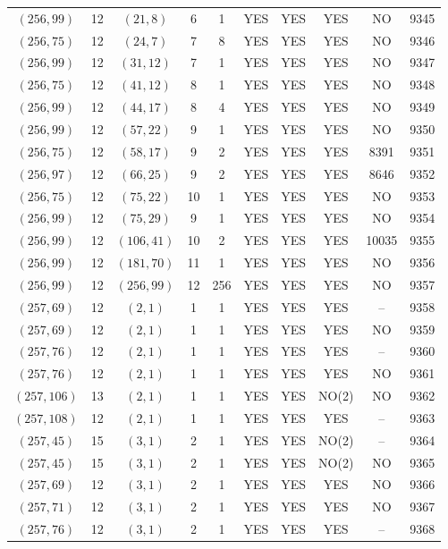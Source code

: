 \begin{longtable}{|c|c|c|c|c|c|c|c|c|c|}
$(256, 99)$ & 12 & $(21, 8)$ & 6 & 1 & YES & YES & YES & NO & 9345\\
$(256, 75)$ & 12 & $(24, 7)$ & 7 & 8 & YES & YES & YES & NO & 9346\\
$(256, 99)$ & 12 & $(31, 12)$ & 7 & 1 & YES & YES & YES & NO & 9347\\
$(256, 75)$ & 12 & $(41, 12)$ & 8 & 1 & YES & YES & YES & NO & 9348\\
$(256, 99)$ & 12 & $(44, 17)$ & 8 & 4 & YES & YES & YES & NO & 9349\\
$(256, 99)$ & 12 & $(57, 22)$ & 9 & 1 & YES & YES & YES & NO & 9350\\
$(256, 75)$ & 12 & $(58, 17)$ & 9 & 2 & YES & YES & YES & 8391 & 9351\\
$(256, 97)$ & 12 & $(66, 25)$ & 9 & 2 & YES & YES & YES & 8646 & 9352\\
$(256, 75)$ & 12 & $(75, 22)$ & 10 & 1 & YES & YES & YES & NO & 9353\\
$(256, 99)$ & 12 & $(75, 29)$ & 9 & 1 & YES & YES & YES & NO & 9354\\
$(256, 99)$ & 12 & $(106, 41)$ & 10 & 2 & YES & YES & YES & 10035 & 9355\\
$(256, 99)$ & 12 & $(181, 70)$ & 11 & 1 & YES & YES & YES & NO & 9356\\
$(256, 99)$ & 12 & $(256, 99)$ & 12 & 256 & YES & YES & YES & NO & 9357\\
$(257, 69)$ & 12 & $(2, 1)$ & 1 & 1 & YES & YES & YES & -- & 9358\\
$(257, 69)$ & 12 & $(2, 1)$ & 1 & 1 & YES & YES & YES & NO & 9359\\
$(257, 76)$ & 12 & $(2, 1)$ & 1 & 1 & YES & YES & YES & -- & 9360\\
$(257, 76)$ & 12 & $(2, 1)$ & 1 & 1 & YES & YES & YES & NO & 9361\\
$(257, 106)$ & 13 & $(2, 1)$ & 1 & 1 & YES & YES & NO(2) & NO & 9362\\
$(257, 108)$ & 12 & $(2, 1)$ & 1 & 1 & YES & YES & YES & -- & 9363\\
$(257, 45)$ & 15 & $(3, 1)$ & 2 & 1 & YES & YES & NO(2) & -- & 9364\\
$(257, 45)$ & 15 & $(3, 1)$ & 2 & 1 & YES & YES & NO(2) & NO & 9365\\
$(257, 69)$ & 12 & $(3, 1)$ & 2 & 1 & YES & YES & YES & NO & 9366\\
$(257, 71)$ & 12 & $(3, 1)$ & 2 & 1 & YES & YES & YES & NO & 9367\\
$(257, 76)$ & 12 & $(3, 1)$ & 2 & 1 & YES & YES & YES & -- & 9368\\

\end{longtable}
